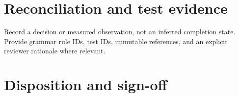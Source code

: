 \documentclass[11pt,letterpaper]{article}
\begin{document}
\section{Reconciliation and test evidence}
Record a decision or measured observation, not an inferred completion state. Provide grammar rule IDs, test IDs, immutable references, and an explicit reviewer rationale where relevant.
\section{Disposition and sign-off}
\end{document}

